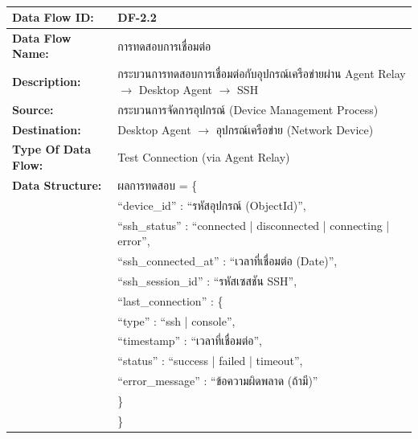 \begin{table}[H]
    \caption{}
    \label{tab:df-2-2}
    \fontSixTeen 
    \begin{tabularx}{\textwidth}{|l|L|} 
        \hline
        \textbf{Data Flow ID:} & DF-2.2 \\
        \hline
        \textbf{Data Flow Name:} & การทดสอบการเชื่อมต่อ \\
        \hline
        \textbf{Description:} & กระบวนการทดสอบการเชื่อมต่อกับอุปกรณ์เครือข่ายผ่าน Agent Relay $\rightarrow$ Desktop Agent $\rightarrow$ SSH \\
        \hline
        \textbf{Source:} & กระบวนการจัดการอุปกรณ์ (Device Management Process) \\
        \hline
        \textbf{Destination:} & Desktop Agent $\rightarrow$ อุปกรณ์เครือข่าย (Network Device) \\
        \hline
        \textbf{Type Of Data Flow:} & Test Connection (via Agent Relay) \\
        \hline
        \textbf{Data Structure:} & ผลการทดสอบ = \{ \nonumber \\
                        & \hspace{1em} ``device\_id'' : ``รหัสอุปกรณ์ (ObjectId)'', \nonumber \\
                        & \hspace{1em} ``ssh\_status'' : ``connected | disconnected | connecting | error'', \nonumber \\
                        & \hspace{1em} ``ssh\_connected\_at'' : ``เวลาที่เชื่อมต่อ (Date)'', \nonumber \\
                        & \hspace{1em} ``ssh\_session\_id'' : ``รหัสเซสชัน SSH'', \nonumber \\
                        & \hspace{1em} ``last\_connection'' : \{ \nonumber \\
                        & \hspace{2em} ``type'' : ``ssh | console'', \nonumber \\
                        & \hspace{2em} ``timestamp'' : ``เวลาที่เชื่อมต่อ'', \nonumber \\
                        & \hspace{2em} ``status'' : ``success | failed | timeout'', \nonumber \\
                        & \hspace{2em} ``error\_message'' : ``ข้อความผิดพลาด (ถ้ามี)'' \nonumber \\
                        & \hspace{1em} \} \nonumber \\
                        & \} \\
        \hline
    \end{tabularx}
\end{table}

